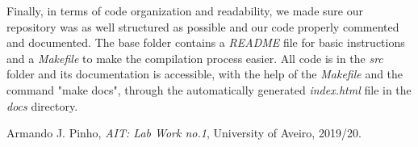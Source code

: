 \documentclass[12pt]{article}
\begin{document}
Finally, in terms of code organization and readability, we made sure our 
repository was as well structured as possible and our code properly commented
and documented.
The base folder contains a {\it README\/} file for basic instructions and a 
{\it Makefile\/} to make the compilation process easier.
All code is in the {\it src\/} folder and its documentation is accessible, 
with the help of the {\it Makefile\/} and the command "make docs", through
the automatically generated {\it index.html\/} file in the {\it docs\/} directory.

\begin{thebibliography}{9}
  

    Armando J. Pinho,
    \textit{AIT: Lab Work no.1},
    University of Aveiro,
    2019/20.
  
\end{thebibliography}

\clearpage
\end{document}
